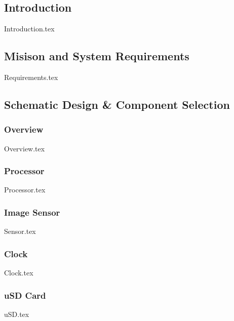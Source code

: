 \subsection{Introduction}
    {Introduction.tex}

\subsection{Misison and System Requirements}\label{sec:v0-requirements}
    {Requirements.tex}

\subsection{Schematic Design \& Component Selection} \label{sec:v0-schematic}

    \subsubsection{Overview}
        {Overview.tex}

    \subsubsection{Processor}\label{sec:schematic-processor}
        {Processor.tex}
    \subsubsection{Image Sensor} \label{sec:schematic-sensor}
        {Sensor.tex}

    \subsubsection{Clock}\label{sec:v0-clocks}
        {Clock.tex}

    \subsubsection{uSD Card}
        {uSD.tex}

